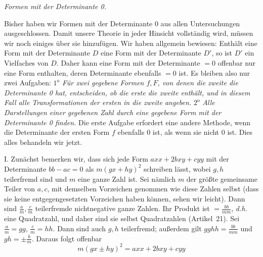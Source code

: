 \begin{center}
\textit{Formen mit der Determinante 0.}
\end{center}

Bisher haben wir Formen mit der Determinante 0 aus allen Untersuchungen ausgeschlossen. Damit unsere Theorie in jeder Hinsicht vollständig wird, müssen wir noch einiges über sie hinzufügen. Wir haben allgemein bewiesen: Enthält eine Form mit der Determinante $D$ eine Form mit der Determinante $D'$, so ist $D'$ ein Vielfaches von $D$. Daher kann eine Form mit der Determinante $=0$ offenbar nur eine Form enthalten, deren Determinante ebenfalls $=0$ ist. Es bleiben also nur zwei Aufgaben: $1^{\mathrm{o}}$ \textit{Für zwei gegebene Formen $f,F$, von denen die zweite die Determinante 0 hat, entscheiden, ob die erste die zweite enthält, und in diesem Fall alle Transformationen der ersten in die zweite angeben.} $2^{\mathrm{o}}$ \textit{Alle Darstellungen einer gegebenen Zahl durch eine gegebene Form mit der Determinante 0 finden.} Die erste Aufgabe erfordert eine andere
Methode, wenn die Determinante der ersten Form $f$ ebenfalls 0 ist, als wenn sie nicht 0 ist. Dies alles behandeln wir jetzt.

I. Zunächst bemerken wir, dass sich jede Form $axx+2bxy+cyy$ mit der Determinante $bb-ac=0$ als $m(gx+hy)^2$ schreiben lässt, wobei $g,h$ teilerfremd sind und $m$ eine ganze Zahl ist. Sei nämlich $m$ der größte gemeinsame Teiler von $a,c$, mit demselben Vorzeichen genommen wie diese Zahlen selbst (dass sie keine entgegengesetzten Vorzeichen haben können, sehen wir leicht). Dann sind $\frac{a}{m},\frac{c}{m}$ teilerfremde nichtnegative ganze Zahlen. Ihr Produkt ist $=\frac{bb}{mm}$, \textit{d.h.} eine Quadratzahl, und daher sind sie selbst Quadratzahlen (Artikel~21). Sei $\frac{a}{m}=gg$, $\frac{c}{m}=hh$. Dann sind auch $g,h$ teilerfremd; außerdem gilt $gghh=\frac{bb}{mm}$ und $gh=\pm\frac{b}{m}$. Daraus folgt offenbar
\[
m(gx\pm hy)^2=axx+2bxy+cyy
\]

